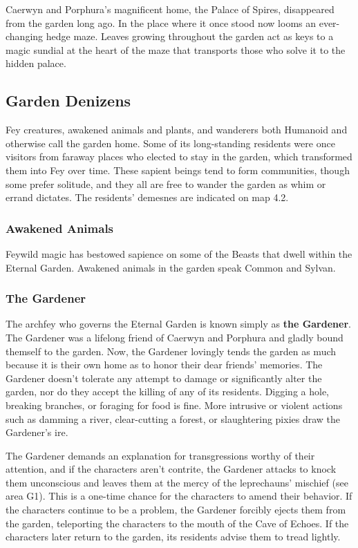 \documentclass[10pt,a4paper,twoside,bg=print,twocolumn,openany,nodeprecatedcode]{dndbook}
\begin{document}
Caerwyn and Porphura's magnificent home, the Palace of Spires, disappeared from the garden long ago. In the place where it once stood now looms an ever-changing hedge maze. Leaves growing throughout the garden act as keys to a magic sundial at the heart of the maze that transports those who solve it to the hidden palace.

\subsection{Garden Denizens}
Fey creatures, awakened animals and plants, and wanderers both Humanoid and otherwise call the garden home. Some of its long-standing residents were once visitors from faraway places who elected to stay in the garden, which transformed them into Fey over time. These sapient beings tend to form communities, though some prefer solitude, and they all are free to wander the garden as whim or errand dictates. The residents' demesnes are indicated on map 4.2.

\subsubsection{Awakened Animals}
Feywild magic has bestowed sapience on some of the Beasts that dwell within the Eternal Garden. Awakened animals in the garden speak Common and Sylvan.

\subsubsection{The Gardener}
The archfey who governs the Eternal Garden is known simply as \textbf{the Gardener}. The Gardener was a lifelong friend of Caerwyn and Porphura and gladly bound themself to the garden. Now, the Gardener lovingly tends the garden as much because it is their own home as to honor their dear friends' memories. The Gardener doesn't tolerate any attempt to damage or significantly alter the garden, nor do they accept the killing of any of its residents. Digging a hole, breaking branches, or foraging for food is fine. More intrusive or violent actions such as damming a river, clear-cutting a forest, or slaughtering pixies draw the Gardener's ire.

The Gardener demands an explanation for transgressions worthy of their attention, and if the characters aren't contrite, the Gardener attacks to knock them unconscious and leaves them at the mercy of the leprechauns' mischief (see area G1). This is a one-time chance for the characters to amend their behavior. If the characters continue to be a problem, the Gardener forcibly ejects them from the garden, teleporting the characters to the mouth of the Cave of Echoes. If the characters later return to the garden, its residents advise them to tread lightly.
\end{document}
